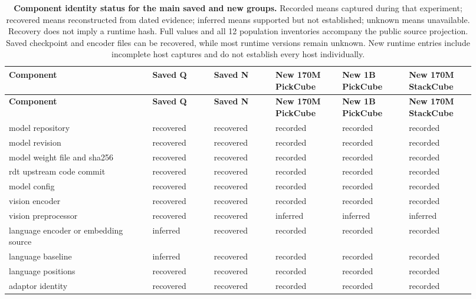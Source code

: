 \setlength{\tabcolsep}{2pt}
\begin{longtable}{p{0.290\linewidth} p{0.120\linewidth} p{0.120\linewidth} p{0.130\linewidth} p{0.130\linewidth} p{0.130\linewidth}}
\caption{\textbf{Component identity status for the main saved and new groups.} Recorded means captured during that experiment; recovered means reconstructed from dated evidence; inferred means supported but not established; unknown means unavailable. Recovery does not imply a runtime hash. Full values and all 12 population inventories accompany the public source projection. Saved checkpoint and encoder files can be recovered, while most runtime versions remain unknown. New runtime entries include incomplete host captures and do not establish every host individually.}\label{tab:r1-identities}\\
\toprule
\textbf{Component} & \textbf{Saved Q} & \textbf{Saved N} & \textbf{New 170M PickCube} & \textbf{New 1B PickCube} & \textbf{New 170M StackCube} \\
\midrule\endfirsthead
\toprule
\textbf{Component} & \textbf{Saved Q} & \textbf{Saved N} & \textbf{New 170M PickCube} & \textbf{New 1B PickCube} & \textbf{New 170M StackCube} \\
\midrule\endhead
\bottomrule\endfoot
model repository & recovered & recovered & recorded & recorded & recorded \\
model revision & recovered & recovered & recorded & recorded & recorded \\
model weight file and sha256 & recovered & recovered & recorded & recorded & recorded \\
rdt upstream code commit & recovered & recovered & recorded & recorded & recorded \\
model config & recovered & recovered & recorded & recorded & recorded \\
vision encoder & recovered & recovered & recorded & recorded & recorded \\
vision preprocessor & recovered & recovered & inferred & inferred & inferred \\
language encoder or embedding source & inferred & recovered & recorded & recorded & recorded \\
language baseline & inferred & recovered & recorded & recorded & recorded \\
language positions & recovered & recovered & recorded & recorded & recorded \\
adaptor identity & recovered & recovered & recorded & recorded & recorded \\

\end{longtable}
